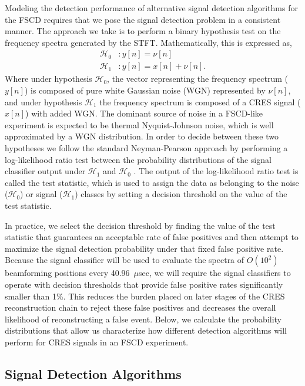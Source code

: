 Modeling the detection performance of alternative signal detection algorithms for the FSCD requires that we pose the signal detection problem in a consistent manner. The approach we take is to perform a binary hypothesis test on the frequency spectra generated by the STFT. Mathematically, this is expressed as,
\begin{align}
    \mathcal{H}_0 & : y[n]=\nu[n]\\
    \mathcal{H}_1 & : y[n]=x[n]+\nu[n].
\end{align}
Where under hypothesis $\mathcal{H}_0$, the vector representing the frequency spectrum ($y[n]$) is composed of pure white Gaussian noise (WGN) represented by $\nu[n]$, and under hypothesis $\mathcal{H}_1$ the frequency spectrum is composed of a CRES signal ($x[n]$) with added WGN. The dominant source of noise in a FSCD-like experiment is expected to be thermal Nyquist-Johnson noise, which is well approximated by a WGN distribution. In order to decide between these two hypotheses we follow the standard Neyman-Pearson approach by performing a log-likelihood ratio test between the probability distributions of the signal classifier output under $\mathcal{H}_1$ and $\mathcal{H}_0$ \cite{detection_theory}. The output of the log-likelihood ratio test is called the test statistic, which is used to assign the data as belonging to the noise ($\mathcal{H}_0$) or signal ($\mathcal{H}_1$) classes by setting a decision threshold on the value of the test statistic. 

In practice, we select the decision threshold by finding the value of the test statistic that guarantees an acceptable rate of false positives and then attempt to maximize the signal detection probability under that fixed false positive rate. Because the signal classifier will be used to evaluate the spectra of $O(10^2)$ beamforming positions every 40.96~$\mu$sec, we will require the signal classifiers to operate with decision thresholds that provide false positive rates significantly smaller than 1\%. This reduces the burden placed on later stages of the CRES reconstruction chain to reject these false positives and decreases the overall likelihood of reconstructing a false event. Below, we calculate the probability distributions that allow us characterize how different detection algorithms will perform for CRES signals in an FSCD experiment.


\subsection{Signal Detection Algorithms}
\label{sec:classifiers}


